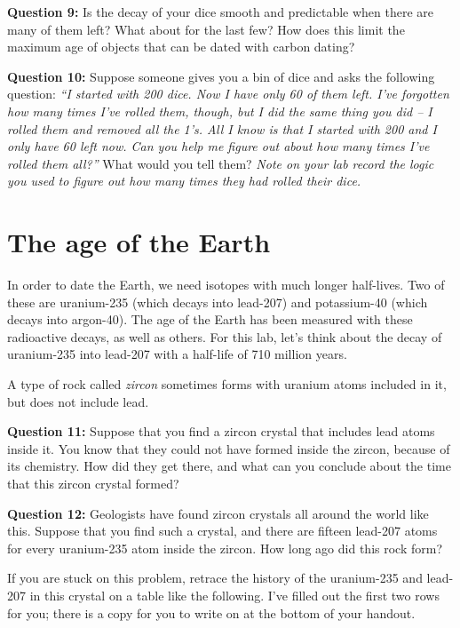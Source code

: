\documentclass[11pt]{article}
\begin{document}
\vspace{1em}

{\bf Question 9:} Is the decay of your dice smooth and predictable when there are many of them left? What about for the last few? How does this limit the maximum age of objects that can be dated with carbon dating? 


\normalsize
{\bf Question 10:} Suppose someone gives you a bin of dice and asks the following question: {\it ``I started with 200 dice. 
Now I have only 60 of them left. I've forgotten how many times I've rolled them, though, but I did the same thing you did -- I rolled
them and removed all the 1's. All I know is that I started with 200 and I only have 60 left now. Can you help me figure out about how many times I've rolled them all?''} 
What would you tell them? {\it Note on your lab record the logic you used to figure out how many times they had rolled their dice.}


\section{The age of the Earth}

In order to date the Earth, we need isotopes with much longer half-lives. Two of these are uranium-235 (which decays into lead-207) and potassium-40 (which decays into argon-40). The age of the Earth has been measured with these radioactive decays,
as well as others. For this lab, let's think about the decay of uranium-235 into lead-207 with a half-life of 710 million years.

A type of rock called {\it zircon} sometimes forms with uranium atoms included in it, but does not include lead. 

{\bf Question 11:} Suppose that you find a zircon crystal that includes lead atoms inside it. You know that they could not have formed inside the zircon, because of its chemistry. How did they get there, and what can you conclude about the time that this zircon crystal formed?

\vspace{1cm}

{\bf Question 12:}
Geologists have found zircon crystals all around the world like this. Suppose that you find such a crystal, and there are fifteen lead-207 atoms for every uranium-235 atom inside the zircon. How long ago
did this rock form? 

If you are stuck on this problem, retrace the history of the uranium-235 and lead-207 in this crystal on a table like the following. I've filled out the first two rows for you; there is a copy for you to write on at the bottom of your handout.
\end{document}
